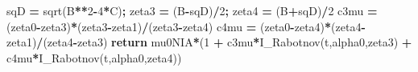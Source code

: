 \documentclass[
  a4paper,
  numbers=noendperiod,
  DIV=12]{scrreprt}
\newenvironment{Shaded}{\begin{snugshade}}{\end{snugshade}}
\newcommand{\ControlFlowTok}[1]{\textcolor[rgb]{0.13,0.29,0.53}{\textbf{#1}}}
\newcommand{\DecValTok}[1]{\textcolor[rgb]{0.00,0.00,0.81}{#1}}
\newcommand{\NormalTok}[1]{#1}
\newcommand{\OperatorTok}[1]{\textcolor[rgb]{0.81,0.36,0.00}{\textbf{#1}}}
\begin{document}
\begin{Shaded}
\begin{Highlighting}[]
\NormalTok{    sqD }\OperatorTok{=}\NormalTok{ sqrt(B}\OperatorTok{**}\DecValTok{2}\OperatorTok{{-}}\DecValTok{4}\OperatorTok{*}\NormalTok{C)}\OperatorTok{;}\NormalTok{  zeta3 }\OperatorTok{=}\NormalTok{ (B}\OperatorTok{{-}}\NormalTok{sqD)}\OperatorTok{/}\DecValTok{2}\OperatorTok{;}\NormalTok{  zeta4 }\OperatorTok{=}\NormalTok{ (B}\OperatorTok{+}\NormalTok{sqD)}\OperatorTok{/}\DecValTok{2}
\NormalTok{    c3mu }\OperatorTok{=}\NormalTok{ (zeta0}\OperatorTok{{-}}\NormalTok{zeta3)}\OperatorTok{*}\NormalTok{(zeta3}\OperatorTok{{-}}\NormalTok{zeta1)}\OperatorTok{/}\NormalTok{(zeta3}\OperatorTok{{-}}\NormalTok{zeta4)}
\NormalTok{    c4mu }\OperatorTok{=}\NormalTok{ (zeta0}\OperatorTok{{-}}\NormalTok{zeta4)}\OperatorTok{*}\NormalTok{(zeta4}\OperatorTok{{-}}\NormalTok{zeta1)}\OperatorTok{/}\NormalTok{(zeta4}\OperatorTok{{-}}\NormalTok{zeta3)}
    \ControlFlowTok{return}\NormalTok{ mu0NIA}\OperatorTok{*}\NormalTok{(}\DecValTok{1} \OperatorTok{+}\NormalTok{ c3mu}\OperatorTok{*}\NormalTok{I\_Rabotnov(t,alpha0,zeta3) }\OperatorTok{+}\NormalTok{ c4mu}\OperatorTok{*}\NormalTok{I\_Rabotnov(t,alpha0,zeta4))}


\end{Highlighting}
\end{Shaded}
\end{document}
